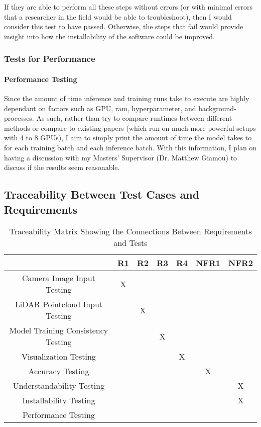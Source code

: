 \documentclass[12pt, titlepage]{article}
\begin{document}
If they are able to perform all these steps without errors (or with minimal errors that a researcher in the field would be able to troubleshoot),
then I would consider this test to have passed. Otherwise, the steps that fail would provide insight into how the installability of the software could be improved.

\subsubsection{Tests for Performance}

\paragraph{Performance Testing}

Since the amount of time inference and training runs take to execute are highly dependant on factors such as GPU, ram, hyperparameter, and background-processes.
As such, rather than try to compare runtimes between different methods or compare to existing papers (which run on much more powerful setups with 4 to 8 GPUs), I aim
to simply print the amount of time the model takes to for each training batch and each inference batch. With this information, I plan on having a discussion with my Masters' 
Supervisor (Dr. Matthew Giamou) to discuss if the results seem reasonable.

\subsection{Traceability Between Test Cases and Requirements}

\begin{table}[h!]
  \centering
  \begin{tabular}{|c|c|c|c|c|c|c|}
  \hline
    & R1 & R2 & R3 & R4 & NFR1 & NFR2 \\
  \hline
  Camera Image Input Testing             &X& & & & & \\ \hline
  LiDAR Pointcloud Input Testing         & &X& & & & \\ \hline
  Model Training Consistency Testing     & & &X& & & \\ \hline
  Visualization Testing                  & & & &X& & \\ \hline
  Accuracy Testing                       & & & & &X& \\ \hline
  Understandability Testing              & & & & & &X\\ \hline
  Installability Testing                 & & & & & &X\\ \hline
  Performance Testing                    & & & & & & \\ \hline
  \hline
  \end{tabular}
  \caption{Traceability Matrix Showing the Connections Between Requirements and Tests}
  \label{Table:R_trace}
  \end{table}
\end{document}
